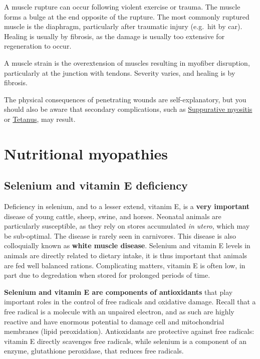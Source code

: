 \documentclass[openany]{book}
\begin{document}
A muscle rupture can occur following violent exercise or trauma. The
muscle forms a bulge at the end opposite of the rupture. The most
commonly ruptured muscle is the diaphragm, particularly after traumatic
injury (e.g.~hit by car). Healing is usually by fibrosis, as the damage
is usually too extensive for regeneration to occur.

A muscle strain is the overextension of muscles resulting in myofiber
disruption, particularly at the junction with tendons. Severity varies,
and healing is by fibrosis.

The physical consequences of penetrating wounds are self-explanatory,
but you should also be aware that secondary complications, such as
\protect\hyperlink{suppurative-myositis}{Suppurative myositis} or
\protect\hyperlink{tetanus}{Tetanus}, may result.

\chapter{Nutritional myopathies}\label{nutritional-myopathies}

\hypertarget{selenium-and-vitamin-e-deficiency}{\section{Selenium and
vitamin E deficiency}\label{selenium-and-vitamin-e-deficiency}}

Deficiency in selenium, and to a lesser extend, vitanim E, is a
\textbf{very important} disease of young cattle, sheep, swine, and
horses. Neonatal animals are particularly susceptible, as they rely on
stores accumulated \emph{in utero}, which may be sub-optimal. The
disease is rarely seen in carnivores. This disease is also colloquially
known as \textbf{white muscle disease}. Selenium and vitamin E levels in
animals are directly related to dietary intake, it is thus important
that animals are fed well balanced rations. Complicating matters,
vitamin E is often low, in part due to degredation when stored for
prolonged periods of time.

\textbf{Selenium and vitamin E are components of antioxidants} that play
important roles in the control of free radicals and oxidative damage.
Recall that a free radical is a molecule with an unpaired electron, and
as such are highly reactive and have enormous potential to damage cell
and mitochondrial membranes (lipid peroxidation). Antioxidants are
protective against free radicals: vitamin E directly scavenges free
radicals, while selenium is a component of an enzyme, glutathione
peroxidase, that reduces free radicals.
\end{document}

